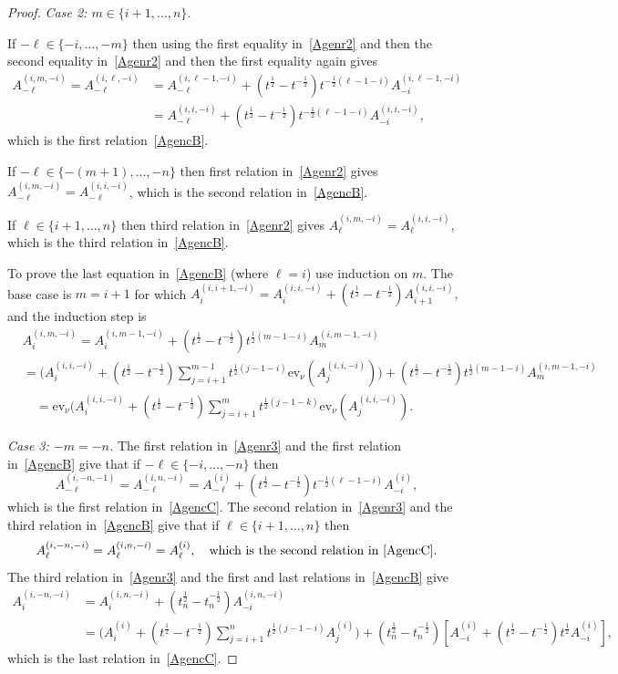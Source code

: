 \documentclass[11pt]{article}
\theoremstyle{plain}
\theoremstyle{definition}
\theoremstyle{remark}
\numberwithin{equation}{section}
\def\ev{\mathrm{ev}}
\newcounter{r}
\newcounter{s}
\begin{document}
\begin{proof}
\emph{Case 2: $m\in \{i+1, \ldots, n\}$.} 

\noindent
If $-\ell\in \{-i, \ldots, -m\}$ then using the first equality in~\eqref{Agenr2}
and then the second equality in~\eqref{Agenr2} and then the first equality again gives
\begin{align*}
A^{(i,m,-i)}_{-\ell} =  A^{(i,\ell,-i)}_{-\ell} 
&=A^{(i,\ell-1,-i)}_{-\ell} + (t^{\frac12}-t^{-\frac12})t^{-\frac12(\ell-1-i)} A^{(i,\ell-1,-i)}_{-i} \\
&=A^{(i,i,-i)}_{-\ell} + (t^{\frac12}-t^{-\frac12})t^{-\frac12(\ell-1-i)} A^{(i,i,-i)}_{-i},
\end{align*}
which is the first relation~\eqref{AgencB}.

\noindent
If $-\ell\in \{-(m+1), \ldots, -n\}$ then first relation in~\eqref{Agenr2} gives $A^{(i,m,-i)}_{-\ell} = A^{(i,i,-i)}_{-\ell}$, 
which is the second relation in~\eqref{AgencB}.

\noindent
If $\ell\in \{i+1, \ldots, n\}$ then third relation in~\eqref{Agenr2} gives $A^{(i,m,-i)}_\ell = A^{(i,i,-i)}_\ell$, which is the
third relation in~\eqref{AgencB}.

\noindent
To prove the last equation in~\eqref{AgencB} (where $\ell=i$) use induction on $m$.
The base case is $m=i+1$ for which
$A^{(i,i+1,-i)}_i = A^{(i,i,-i)}_i+ (t^{\frac12}-t^{-\frac12}) A^{(i,i,-i)}_{i+1},
$
and the induction step is
\begin{align*}
&A^{(i,m,-i)}_i = A^{(i,m-1,-i)}_i + (t^{\frac12}-t^{-\frac12})t^{\frac12(m-1-i)} A^{(i,m-1,-i)}_m \\ 
&= \Big(A^{(i,i,-i)}_i+ (t^{\frac12}-t^{-\frac12})\sum_{j=i+1}^{m-1} t^{\frac12(j-1-i)}\ev_\nu(A^{(i,i,-i)}_j)\Big)
+ (t^{\frac12}-t^{-\frac12})t^{\frac12(m-1-i)} A^{(i,m-1,-i)}_m \\
&\quad= \ev_\nu(A^{(i,i,-i)}_i+ (t^{\frac12}-t^{-\frac12})
\sum_{j=i+1}^m t^{\frac12(j-1-k)}\ev_\nu(A^{(i,i,-i)}_j).
\end{align*}

\smallskip\noindent
\emph{Case 3: $-m= -n$.} 
The first relation in~\eqref{Agenr3} and the first relation in~\eqref{AgencB} give that if $-\ell\in \{-i, \ldots, -n\}$ then
$$A^{(i, -n,-1)}_{-\ell} = A^{(i,n,-i)}_{-\ell} = 
A^{(i)}_{-\ell}+(t^{\frac12}-t^{-\frac12})t^{-\frac12(\ell-1-i)}A^{(i)}_{-i},$$
which is the first relation in~\eqref{AgencC}.  The second relation in~\eqref{Agenr3} and the third relation in~\eqref{AgencB} give
that if $\ell\in \{i+1, \ldots, n\}$ then
$$A^{(i,-n,-i)}_\ell = A^{(i,n,-i)}_\ell = A^{(i)}_\ell,
\quad\hbox{which is the second relation in~\eqref{AgencC}.}
$$
The third relation in~\eqref{Agenr3} and the first and last relations in~\eqref{AgencB} give
\begin{align*}
A^{(i,-n,-i)}_i 
&= A^{(i,n,-i)}_i + (t_n^{\frac12}-t_n^{-\frac12})A^{(i,n,-i)}_{-i}
\\
&= \Big(A^{(i)}_i +(t^{\frac12}-t^{-\frac12})\sum_{j=i+1}^n t^{\frac12(j-1-i)}A^{(i)}_j\Big)
+(t_n^{\frac12}-t_n^{-\frac12})\left[A^{(i)}_{-i}+(t^{\frac12}-t^{-\frac12})t^{\frac12}A^{(i)}_{-i}\right],
\end{align*}
which is the last relation in~\eqref{AgencC}.



\end{proof}
\end{document}
